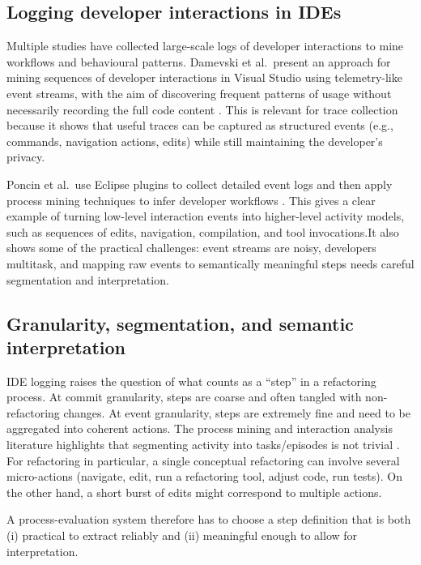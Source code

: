 \subsection{Logging developer interactions in IDEs}
Multiple studies have collected large-scale logs of developer interactions to mine workflows and behavioural patterns. Damevski et al.\ present an approach for mining sequences of developer interactions in Visual Studio using telemetry-like event streams, with the aim of discovering frequent patterns of usage without necessarily recording the full code content \cite{damevski2017usagesmells}. This is relevant for trace collection because it shows that useful traces can be captured as structured events (e.g., commands, navigation actions, edits) while still maintaining the developer's privacy.

Poncin et al.\ use Eclipse plugins to collect detailed event logs and then apply process mining techniques to infer developer workflows \cite{poncin2011processmining}. This gives a clear example of turning low-level interaction events into higher-level activity models, such   as sequences of edits, navigation, compilation, and tool invocations.It also shows some of the practical challenges: event streams are noisy, developers multitask, and mapping raw events to semantically meaningful steps needs careful segmentation and interpretation.

\subsection{Granularity, segmentation, and semantic interpretation}
IDE logging raises the question of what counts as a ``step'' in a refactoring process. At commit granularity, steps are coarse and often tangled with non-refactoring changes. At event granularity, steps are extremely fine and need to be aggregated into coherent actions. The process mining and interaction analysis literature highlights that segmenting activity into tasks/episodes is not trivial \cite{poncin2011rabbiteclipse,damevski2014visualstudio}. For refactoring in particular, a single conceptual refactoring can involve several micro-actions (navigate, edit, run a refactoring tool, adjust code, run tests). On the other hand, a short burst of edits might correspond to multiple actions.

A process-evaluation system therefore has to choose a step definition that is both (i) practical to extract reliably and (ii) meaningful enough to allow for interpretation.

